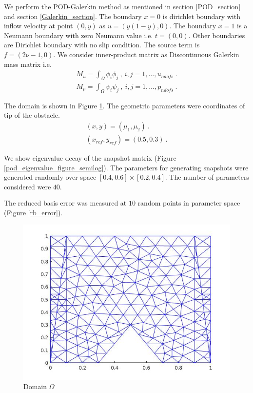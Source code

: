 \documentclass[a4paper,oneside,openright,spanish,english]{book}
\begin{document}
We perform the POD-Galerkin method as mentioned in section \ref{POD_section} and section \ref{Galerkin_section}. The boundary ${x=0}$ is dirichlet boundary with inflow velocity at point $(0,y)$ as $u = (y(1-y), 0)$. The boundary ${x = 1}$ is a Neumann boundary with zero Neumann value i.e. $t = (0, 0)$. Other boundaries are Dirichlet boundary with no slip condition. The source term is $f = (2 \nu - 1, 0)$. We consider inner-product matrix as Discontinuous Galerkin mass matrix i.e.
\begin{gather}
M_u = \int_{\Omega} \phi_i \phi_j \ , \ i,j = 1, \ldots, u_{ndofs} \ . \\
M_p = \int_{\Omega} \psi_i \psi_j \ , \ i,j = 1, \ldots, p_{ndofs} \ .
\end{gather}

The domain is shown in Figure \ref{pod_figure}. The geometric parameters were coordinates of tip of the obstacle.
\begin{gather}
(x,y) = (\mu_1,\mu_2) \ . \\
(x_{ref},y_{ref}) = (0.5,0.3) \ .
\end{gather}

We show eigenvalue decay of the snapshot matrix (Figure \ref{pod_eigenvalue_figure_semilog}). The parameters for generating snapshots were generated randomly over space $[0.4,0.6] \times [0.2,0.4]$. The number of parameters considered were $40$. 

The reduced basis error was measured at $10$ random points in parameter space (Figure \ref{rb_error}).

\begin{figure}
  \includegraphics[width=\linewidth]{pod_figure.jpg}
  \caption{Domain $\Omega$} 
  \label{pod_figure}
\end{figure}
\end{document}
